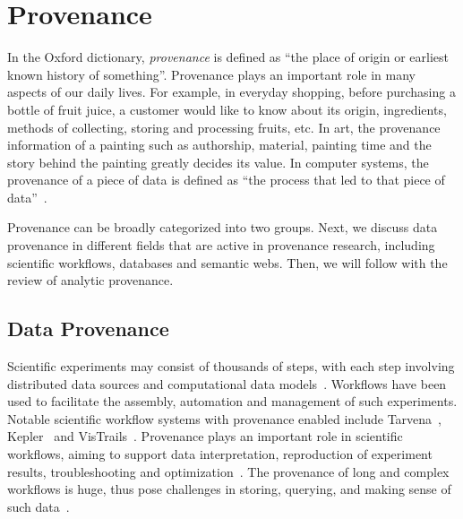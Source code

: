 \section{Provenance}
In the Oxford dictionary, \emph{provenance} is defined as ``the place of origin or earliest known history of something''. Provenance plays an important role in many aspects of our daily lives. For example, in everyday shopping, before purchasing a bottle of fruit juice, a customer would like to know about its origin, ingredients, methods of collecting, storing and processing fruits, etc. In art, the provenance information of a painting such as authorship, material, painting time and the story behind the painting greatly decides its value. In computer systems, the provenance of a piece of data is defined as ``the process that led to that piece of data''~\cite{Moreau2011}. 

Provenance can be broadly categorized into two groups.  Next, we discuss data provenance in different fields that are active in provenance research, including scientific workflows, databases and semantic webs. Then, we will follow with the review of analytic provenance.

\subsection{Data Provenance}
\label{sub:lr-data-provenance}
Scientific experiments may consist of thousands of steps, with each step involving distributed data sources and computational data models~\cite{Gil2007}. Workflows have been used to facilitate the assembly, automation and management of such experiments. Notable scientific workflow systems with provenance enabled include Tarvena~\cite{Zhao2008}, Kepler~\cite{Bowers2006} and VisTrails~\cite{Bavoil2005}. Provenance plays an important role in scientific workflows, aiming to support data interpretation, reproduction of experiment results, troubleshooting and optimization~\cite{Miles2007}.  The provenance of long and complex workflows is huge, thus pose challenges in storing, querying, and making sense of such data~\cite{Davidson2007}.

